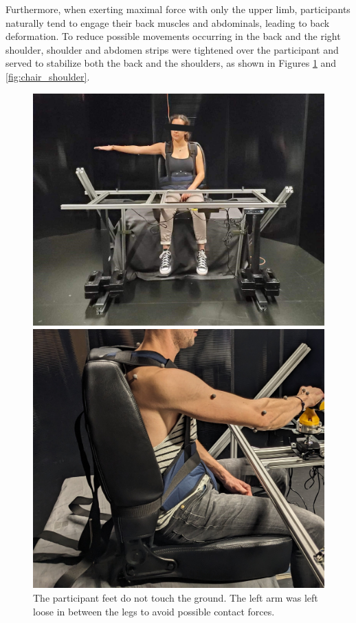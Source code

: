 Furthermore, when exerting maximal force with only the upper limb, participants naturally tend to engage their back muscles and abdominals, leading to back deformation. To reduce possible movements occurring in the back and the right shoulder, shoulder and abdomen strips were tightened over the participant and served to stabilize both the back and the shoulders, as shown in Figures \ref{fig:chair_elevated} and \ref{fig:chair_shoulder}.
\begin{figure}[!htb]
    \centering
    \begin{minipage}{0.49\linewidth}
        \captionsetup{justification=centering}
        \centering
        \includegraphics[clip, width=1\linewidth]{img/chapter_5/chair_elevated_01_cut.jpg}
        \caption{The participant feet do not touch the ground. The left arm was left loose in between the legs to avoid possible contact forces.}
        \label{fig:chair_elevated}
    \end{minipage}
    \hfill
    \begin{minipage}{0.49\linewidth}
        \captionsetup{justification=centering}
        \centering
        \includegraphics[clip, width=0.9\linewidth]{img/chapter_5/chair_stabilize_shoulder_.jpg}

\end{minipage}
\end{figure}
